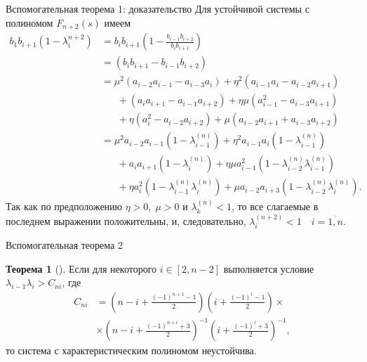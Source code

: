 \documentclass[notheorems,aspectratio=169]{beamer}
\theoremstyle{definition}
\newtheorem{theorem}{Теорема}
\newcommand{\paren}[1]{\left(#1\right)}
\begin{document}
\begin{frame}{Вспомогательная теорема 1: доказательство}
  Для устойчивой системы с полиномом $F_{n+2}(s)$ имеем
  \begin{equation*}
    \begin{aligned}
      b_1 b_{i+1} (1 - \lambda_i^{n+2}) &= b_i b_{i+1} (1 - \frac{b_{i-1} b_{i+2}}{b_{i} b_{i+1}}) \\
      &= (b_i b_{i+1} - b_{i-1} b_{i+2}) \\
      &= \mu^2 (a_{i-2} a_{i-1} - a_{i-3} a_i) + \eta^2 (a_{i-1} a_i - a_{i-2} a_{i+1}) \\
      &\phantom{=\;} + (a_i a_{i+1} - a_{i-1} a_{i+2}) + \eta \mu (a_{i-1}^2 - a_{i-3}a_{i+1}) \\
      &\phantom{=\;} + \eta (a_i^2 - a_{i-2} a_{i+2}) + \mu (a_{i-2} a_{i+1} + a_{i-3} a_{i+2}) \\
      &= \mu^2 a_{i-2} a_{i-1} (1 - \lambda_{i-1}^{(n)}) + \eta^2 a_{i-1} a_i (1 - \lambda_{i-1}^{(n)}) \\
      &\phantom{=\;} + a_i a_{i+1} (1 - \lambda_{i}^{(n)}) + \eta \mu a_{i-1}^2 (1 - \lambda_{i-2}^{(n)} \lambda_{i-1}^{(n)}) \\
      &\phantom{=\;} + \eta a_i^2 (1 - \lambda_{i-1}^{(n)} \lambda_{i}^{(n)}) + \mu a_{i-2} a_{i+3} (1 - \lambda_{i-2}^{(n)} \lambda_{i}^{(n)}).
    \end{aligned}
  \end{equation*}
  Так как по предположению $\eta > 0, \; \mu > 0$ и $\lambda_k^{(n)} < 1$, то все слагаемые в последнем выражении положительны, и, следовательно,
  $\lambda_{i}^{(n+2)} < 1 \quad i=\overline{1,n}$.
\end{frame}

\begin{frame}{Вспомогательная теорема 2}
  \begin{theorem}[\cite{LipatovSokolov1978}]\label{th:helper_2}
    Если для некоторого $i \in [2, n-2]$ выполняется условие $\lambda_{i-1} \lambda_i > C_{ni}$, где
    \begin{equation*}
      \begin{aligned}
        C_{ni} &= \paren{n - i + \frac{{(-1)}^{n+1} - 1}{2}} \paren{i + \frac{{(-1)}^i - 1}{2}} \times \\
        &\times \paren{n - i + \frac{{(-1)}^{n+i} + 3}{2}}^{-1} \paren{i + \frac{{(-1)}^{i} + 3}{2}}^{-1},
      \end{aligned}
    \end{equation*}
    то система с характеристическим полиномом неустойчива.
  \end{theorem}
\end{frame}
\end{document}
